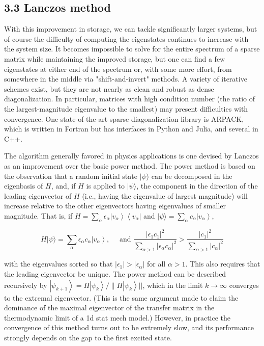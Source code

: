 \documentclass[12pt]{article}
\begin{document}
\subsection*{3.3 Lanczos method}
With this improvement in storage, we can tackle significantly larger systems, but of course the difficulty of computing the eigenstates continues to increase with the system size. It becomes impossible to solve for the entire spectrum of a sparse matrix while maintaining the improved storage, but one can find a few eigenstates at either end of the spectrum or, with some more effort, from somewhere in the middle via "shift-and-invert" methods. A variety of iterative schemes exist, but they are not nearly as clean and robust as dense diagonalization. In particular, matrices with high condition number (the ratio of the largest-magnitude eigenvalue to the smallest) may present difficulties with convergence. One state-of-the-art sparse diagonalization library is ARPACK, which is written in Fortran but has interfaces in Python and Julia, and several in C++.

The algorithm generally favored in physics applications is one devised by Lanczos as an improvement over the basic power method. The power method is based on the observation that a random initial state $|\psi\rangle$ can be decomposed in the eigenbasis of $H$, and, if $H$ is applied to $|\psi\rangle$, the component in the direction of the leading eigenvector of $H$ (i.e., having the eigenvalue of largest magnitude) will increase relative to the other eigenvectors having eigenvalues of smaller magnitude. That is, if $H=\sum_{\alpha} \epsilon_{\alpha}\left|v_{\alpha}\right\rangle\left\langle v_{\alpha}\right|$ and $|\psi\rangle=\sum_{\alpha} c_{\alpha}\left|v_{\alpha}\right\rangle$,


\begin{equation*}
H|\psi\rangle=\sum_{\alpha} \epsilon_{\alpha} c_{\alpha}\left|v_{\alpha}\right\rangle, \quad \text { and } \frac{\left|\epsilon_{1} c_{1}\right|^{2}}{\sum_{\alpha>1}\left|\epsilon_{\alpha} c_{\alpha}\right|^{2}}>\frac{\left|c_{1}\right|^{2}}{\sum_{\alpha>1}\left|c_{\alpha}\right|^{2}} \tag{11}
\end{equation*}


with the eigenvalues sorted so that $\left|\epsilon_{1}\right|>\left|\epsilon_{\alpha}\right|$ for all $\alpha>1$. This also requires that the leading eigenvector be unique. The power method can be described recursively by $\left|\psi_{k+1}\right\rangle=H\left|\psi_{k}\right\rangle / \| H\left|\psi_{k}\right\rangle||$, which in the limit $k \rightarrow \infty$ converges to the extremal eigenvector. (This is the same argument made to claim the dominance of the maximal eigenvector of the transfer matrix in the thermodynamic limit of a 1d stat mech model.) However, in practice the convergence of this method turns out to be extremely slow, and its performance strongly depends on the gap to the first excited state.
\end{document}
